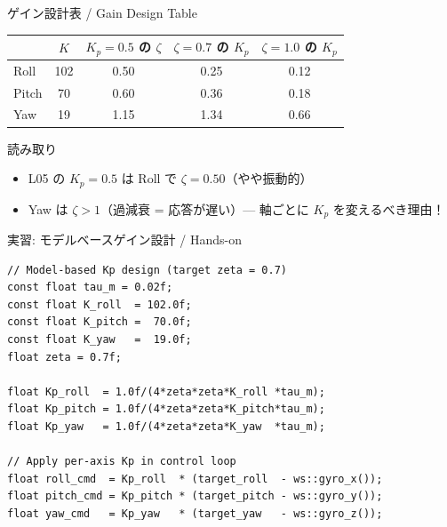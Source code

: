 \documentclass[aspectratio=169, 14pt]{beamer}
\begin{document}
\begin{frame}{ゲイン設計表 / Gain Design Table}
  \begin{table}
    \centering
    \begin{tabular}{lcccc}
      \hline
      & \textbf{$K$} & \textbf{$K_p=0.5$ の $\zeta$}
      & \textbf{$\zeta=0.7$ の $K_p$} & \textbf{$\zeta=1.0$ の $K_p$} \\
      \hline
      Roll  & 102 & 0.50 & 0.25 & 0.12 \\
      Pitch &  70 & 0.60 & 0.36 & 0.18 \\
      Yaw   &  19 & 1.15 & 1.34 & 0.66 \\
      \hline
    \end{tabular}
  \end{table}

  \vspace{0.5em}

  \begin{exampleblock}{読み取り}
    \begin{itemize}
      \item L05 の $K_p=0.5$ は Roll で $\zeta=0.50$（やや振動的）
      \item Yaw は $\zeta > 1$（過減衰 = 応答が遅い）--- 軸ごとに
            $K_p$ を変えるべき理由！
    \end{itemize}
  \end{exampleblock}
\end{frame}

\begin{frame}[fragile]{実習: モデルベースゲイン設計 / Hands-on}
  \begin{lstlisting}[style=sfcpp, title={user\_code.cpp (excerpt)}]
// Model-based Kp design (target zeta = 0.7)
const float tau_m = 0.02f;
const float K_roll  = 102.0f;
const float K_pitch =  70.0f;
const float K_yaw   =  19.0f;
float zeta = 0.7f;

float Kp_roll  = 1.0f/(4*zeta*zeta*K_roll *tau_m);
float Kp_pitch = 1.0f/(4*zeta*zeta*K_pitch*tau_m);
float Kp_yaw   = 1.0f/(4*zeta*zeta*K_yaw  *tau_m);

// Apply per-axis Kp in control loop
float roll_cmd  = Kp_roll  * (target_roll  - ws::gyro_x());
float pitch_cmd = Kp_pitch * (target_pitch - ws::gyro_y());
float yaw_cmd   = Kp_yaw   * (target_yaw   - ws::gyro_z());
  \end{lstlisting}
\end{frame}
\end{document}

